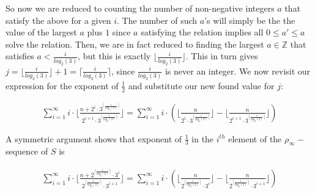 So now we are reduced to counting the number of non-negative integers $a$ that satisfy the above for a given $i$.  The number of such $a$'s will simply be the the value of the largest $a$ plus $1$ since $a$ satisfying the relation implies all $0 \leq a' \leq a$ solve the relation. Then, we are in fact reduced to finding the largest $a \in \mathbb{Z}$ that satisfies $a < \frac{i}{log_2(3)}$, but this is exactly $\lfloor \frac{i}{log_2(3)}\rfloor$. This in turn gives $j =  \lfloor \frac{i}{log_2(3)}\rfloor + 1= \lceil \frac{i}{log_2(3)}\rceil$, since $\frac{i}{log_2(3)}$ is never an integer. We now revisit our expression for the exponent of $\frac{1}{2}$ and substitute our new found value for $j$:

\begin{align} 
\sum_{i=1}^\infty i \cdot \lfloor\frac{n + 2^i \cdot 3^{\lceil \frac{i}{log_2(3)}\rceil}}{2^{i+1}\cdot 3^{\lceil \frac{i}{log_2(3)}\rceil}} \rfloor
=\sum_{i=1}^\infty i \cdot (\lfloor\frac{n}{2^i \cdot 3^{\lceil \frac{i}{log_2(3)}\rceil }}\rfloor -  \lfloor\frac{n}{2^{i+1}\cdot 3^{\lceil \frac{i}{log_2(3)}\rceil}} \rfloor)
\end{align}




A symmetric argument shows that exponent of $\frac{1}{3}$ in the $i^{th}$ element of the $\rho_\infty-$sequence of $S$ is 

\begin{align} 
\sum_{i=1}^\infty i \cdot \lfloor\frac{n + 2^{\lceil \frac{i}{log_3(2)}\rceil} \cdot 3^i}{2^{\lceil \frac{i}{log_3(2)}\rceil}\cdot 3^{i+1}} \rfloor
=\sum_{i=1}^\infty i \cdot (\lfloor\frac{n}{2^{\lceil \frac{i}{log_3(2)}\rceil } \cdot 3^i}\rfloor -  \lfloor\frac{n}{2^{\lceil \frac{i}{log_3(2)}\rceil}\cdot 3^{i+1}} \rfloor)
\end{align}


